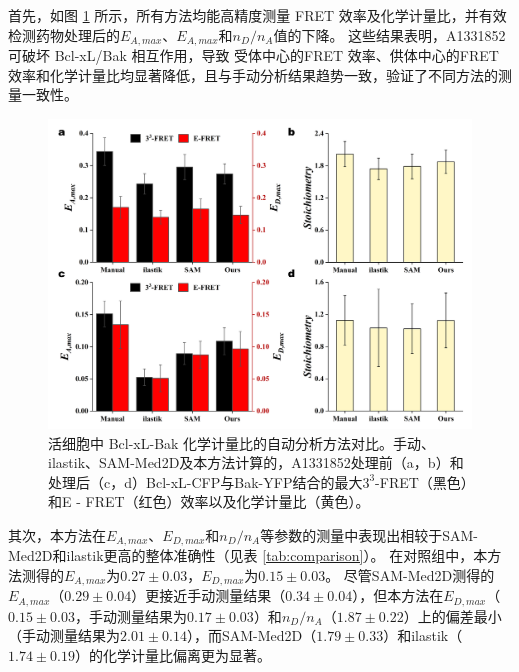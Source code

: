首先，如图 \ref {fig3} 所示，所有方法均能高精度测量 FRET 效率及化学计量比，并有效检测药物处理后的$E_{A,max}$、$E_{A,max}$和$n_D/n_A$值的下降。
这些结果表明，A1331852可破坏 Bcl-xL/Bak 相互作用，导致 受体中心的FRET 效率、供体中心的FRET效率和化学计量比均显著降低，且与手动分析结果趋势一致，验证了不同方法的测量一致性。
\begin{figure}[!htb]
  \centering
  \includegraphics[width=1\linewidth]{../figures/4/4_方法对比.png}
  \caption[活细胞中 Bcl-xL-Bak 化学计量比的自动分析方法对比]{活细胞中 Bcl-xL-Bak 化学计量比的自动分析方法对比。手动、ilastik、SAM-Med2D及本方法计算的，A1331852处理前（a，b）和处理后（c，d）Bcl-xL-CFP与Bak-YFP结合的最大$3^3$-FRET（黑色）和E - FRET（红色）效率以及化学计量比（黄色）。}\label{fig3}
\end{figure}

其次，本方法在$E_{A,max}$、$E_{D,max}$和$n_D/n_A$等参数的测量中表现出相较于SAM-Med2D和ilastik更高的整体准确性（见表 \ref{tab:comparison}）。
在对照组中，本方法测得的$E_{A,max}$为$0.27\pm0.03$，$E_{D,max}$为$0.15\pm0.03$。
尽管SAM-Med2D测得的$E_{A,max}$（$0.29\pm0.04$）更接近手动测量结果（$0.34\pm0.04$），但本方法在$E_{D,max}$（$0.15\pm0.03$，手动测量结果为$0.17\pm0.03$）和$n_D/n_A$（$1.87\pm0.22$）上的偏差最小（手动测量结果为$2.01\pm0.14$），而SAM-Med2D（$1.79\pm0.33$）和ilastik（$1.74\pm0.19$）的化学计量比偏离更为显著。

